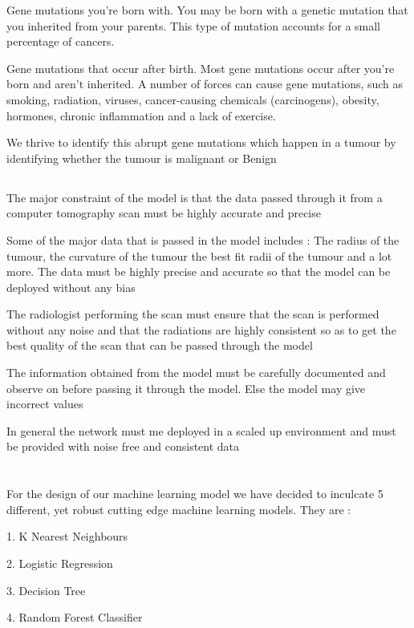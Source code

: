 \documentclass[12pt]{article}
\newcommand{\mainsize}{\fontsize{16pt}{12pt}\selectfont}
\newcommand{\msize}{\fontsize{14pt}{12pt}\selectfont}
\begin{document}
Gene mutations you're born with. You may be born with a genetic mutation that you inherited from your parents. This type of mutation accounts for a small percentage of cancers.

Gene mutations that occur after birth. Most gene mutations occur after you're born and aren't inherited. A number of forces can cause gene mutations, such as smoking, radiation, viruses, cancer-causing chemicals (carcinogens), obesity, hormones, chronic inflammation and a lack of exercise.

We thrive to identify this abrupt gene mutations which happen in a tumour by identifying whether the tumour is malignant or Benign

\newpage
\subsection{\msize{\textbf{CONSTRAINTS}}}
The major constraint of the model is that the data passed through it from a computer tomography scan must be highly accurate and precise 

Some of the major data that is passed in the model includes : The radius of the tumour, the curvature of the tumour the best fit radii of the tumour and a lot more. The data must be highly precise and accurate so that the model can be deployed without any bias 

The radiologist performing the scan must ensure that the scan is performed without any noise and that the radiations are highly consistent so as to get the best quality of the scan that can be passed through the model 

The information obtained from the model must be carefully documented and observe on before passing it through the model. Else the model may give incorrect values

In general the network must me deployed in a scaled up environment and must be provided with noise free and consistent data 
\newpage 
\section{\mainsize{\textbf{DESIGN}}}
For the design of our machine learning model we have decided to inculcate 5 different, yet robust cutting edge machine learning models. They are : 

 1. K Nearest Neighbours

2. Logistic Regression

 3. Decision Tree

 4. Random Forest Classifier
\end{document}
